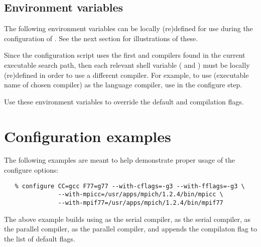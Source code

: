 \subsection*{Environment variables}


\noindent The following environment variables can be locally (re)defined for use 
during the configuration of {\sundials}. See the next section for illustrations of these.

\begin{config}

\item {}

\item {}

  Since the configuration script uses the first {\C} and {\F} compilers found in
  the current executable search path, then each relevant shell variable (
  and ) must be locally (re)defined in order to use a different compiler. 
  For example, to use  (executable name of chosen compiler) as the {\C}
  language compiler, use  in the configure step.

\item {}

\item {}

  Use these environment variables to override the default {\C} and {\F}
  compilation flags.

\end{config}




\section{Configuration examples}

The following examples are meant to help demonstrate proper usage of the configure options:

\begin{verbatim}
   % configure CC=gcc F77=g77 --with-cflags=-g3 --with-fflags=-g3 \
               --with-mpicc=/usr/apps/mpich/1.2.4/bin/mpicc \ 
               --with-mpif77=/usr/apps/mpich/1.2.4/bin/mpif77
\end{verbatim}

\noindent The above example builds {\sundials} using  as the serial {\C}
compiler, \id{g77} as the serial {\F} compiler, \id{mpicc} as the parallel {\C}
compiler, \id{mpif77} as the parallel {\F} compiler, and appends the \id{-g3}
compilaton flag to the list of default flags.

